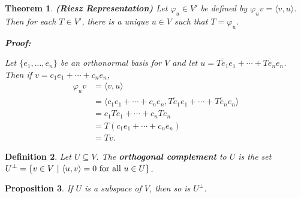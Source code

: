 \documentclass{article}
\theoremstyle{colontheorem}
\newtheorem{theorem}{Theorem}[section]
\newtheorem{proposition}[theorem]{Proposition}
\newtheorem{definition}[theorem]{Definition}
\newenvironment{Theorem}
{
	\begin{mdframed}[backgroundcolor=TheoremOrange!10]
	\begin{theorem}
}
{
	\end{theorem}
	\end{mdframed}
	
	\vspace{.15in}
}
\newenvironment{Proposition}
{
	\begin{mdframed}[backgroundcolor=PropPink!10]
	\begin{proposition}
}
{
	\end{proposition}
	\end{mdframed}
	
	\vspace{.15in}
}
\newenvironment{Def}
{
	\begin{mdframed}[backgroundcolor=DefGreen!10]
	\begin{definition}
}
{
	\end{definition}
	\end{mdframed}
	
	\vspace{.15in}
}
\newenvironment{Proof}
{
	\begin{mdframed}[backgroundcolor=ProofPurple!10]
	\textbf{Proof:}%
}
{
	\end{mdframed}
	
	\vspace{.085in}
}
\begin{document}
\begin{Theorem}
	
	\textbf{(Riesz Representation)} Let $\varphi_u \in V'$ be defined by $\varphi_u v = \langle v, u \rangle$. Then for each $T \in V'$, there is a unique $u \in V$ such that $T = \varphi_u$.
	
	
	\begin{Proof}
		Let $\{e_1, ..., e_n\}$ be an orthonormal basis for $V$ and let $u = \overline{Te_1}e_1 + \cdots + \overline{Te_n}e_n$. Then if $v = c_1 e_1 + \cdots + c_n e_n$,
		\begin{align*}
			\varphi_u v &= \langle v, u \rangle\\
			&= \langle c_1 e_1 + \cdots + c_n e_n, \overline{Te_1}e_1 + \cdots + \overline{Te_n}e_n \rangle\\
			&= c_1 T e_1 + \cdots + c_n T e_n\\
			&= T(c_1 e_1 + \cdots + c_n e_n)\\
			&= Tv.
		\end{align*}
		
	\end{Proof}
	
\end{Theorem}



\begin{Def}
	
	Let $U \subseteq V$. The \textbf{orthogonal complement} to $U$ is the set $U^\perp = \{v \in V\ |\ \langle u, v \rangle = 0\ \textnormal{for all}\ u \in U\}$.
	
\end{Def}



\begin{Proposition}
	
	If $U$ is a subspace of $V$, then so is $U^\perp$.
	
\end{Proposition}
\end{document}
